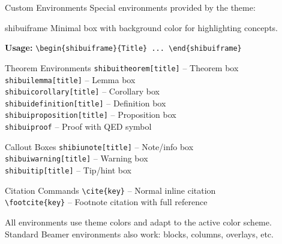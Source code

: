 \documentclass[aspectratio=169]{beamer}
\begin{document}
\begin{frame}[allowframebreaks]{Custom Environments}
  Special environments provided by the theme:

  \vspace{0.5em}

  \begin{shibuiframe}{shibuiframe}
    Minimal box with background color for highlighting concepts.

    \textbf{Usage:} \texttt{\textbackslash begin\{shibuiframe\}\{Title\} ... \textbackslash end\{shibuiframe\}}
  \end{shibuiframe}

  \vspace{0.3em}

  \begin{shibuiframe}{Theorem Environments}
    \texttt{shibuitheorem[title]} -- Theorem box \\
    \texttt{shibuilemma[title]} -- Lemma box \\
    \texttt{shibuicorollary[title]} -- Corollary box \\
    \texttt{shibuidefinition[title]} -- Definition box \\
    \texttt{shibuiproposition[title]} -- Proposition box \\
    \texttt{shibuiproof} -- Proof with QED symbol
  \end{shibuiframe}

  \vspace{0.3em}

  \begin{shibuiframe}{Callout Boxes}
    \texttt{shibiunote[title]} -- Note/info box \\
    \texttt{shibuiwarning[title]} -- Warning box \\
    \texttt{shibuitip[title]} -- Tip/hint box
  \end{shibuiframe}

  \vspace{0.3em}

  \begin{shibuiframe}{Citation Commands}
    \texttt{\textbackslash cite\{key\}} -- Normal inline citation \\
    \texttt{\textbackslash footcite\{key\}} -- Footnote citation with full reference
  \end{shibuiframe}

  \vspace{0.5em}

  All environments use theme colors and adapt to the active color scheme. Standard Beamer environments also work: blocks, columns, overlays, etc.
\end{frame}
\end{document}
